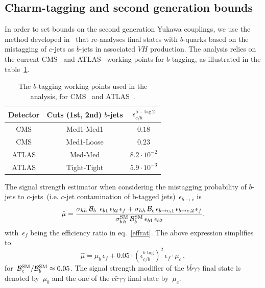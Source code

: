 \subsection{Charm-tagging and second generation bounds}
In order to set bounds on the second generation Yukawa couplings, we use the method developed in~\cite{Perez:2015aoa,Kim:2015oua} that re-analyses final states with $b$-quarks based on the mistagging of $c$-jets as $b$-jets in associated $VH$ production. The analysis relies on the current CMS~\cite{Chatrchyan:2013zna} and ATLAS~\cite{Aad:2014xzb} working points for $b$-tagging, as illustrated in the table~\ref{btag_wp}.
\begin{table}
	\centering
	\begin{tabular}{ccc}
		\toprule
		Detector	& Cuts (1st, 2nd) $b$-jets	& $\epsilon_{c/b}^{\mathrm{b-tag}\,2}$  \\
		\midrule
		CMS    & Med1-Med1   & $0.18$               \\
		CMS    & Med1-Loose  & $0.23$                \\
		\hline
		ATLAS  & Med-Med     & $8.2 \cdot 10^{-2}$ \\
		ATLAS  & Tight-Tight & $5.9 \cdot 10^{-3}$ \\
		\bottomrule
	\end{tabular}
	\caption{The $b$-tagging working points used in the analysis, for CMS~\cite{Chatrchyan:2013zna} and ATLAS~\cite{Aad:2014xzb}. }
	\label{btag_wp}
\end{table}
The signal strength estimator when considering the mistagging probability  of $b$-jets to $c$-jets~(i.e. $c$-jet contamination of b-tagged jets)~$\epsilon_{b\to c}$ is
\begin{equation}
	\hat \mu = \frac{\sigma_{hh}\, \mathcal B_b\ \,\epsilon_{b1}\,\epsilon_{b2} \,\epsilon_f+\sigma_{hh}\, \mathcal B_c \,\epsilon_{b\to c,1} \,\epsilon_{b\to c,2}\,\epsilon_f }{\sigma_{hh}^{\mathrm{SM}}\, \mathcal B_b^{\mathrm{SM}}\,  \epsilon_{b1}\,\epsilon_{b2}},
\end{equation}
with~$\epsilon_f$ being the efficiency ratio in eq.~\eqref{effrat}. The above expression simplifies to
\begin{equation}
	\hat \mu = \mu_b\,\epsilon_f +0.05\cdot \left(\epsilon_{c/b}^{\text{$b$-tag}}\right)^2 \, \epsilon_f \cdot  \mu_c\,,
\end{equation}
for~$ \mathcal B_c^{\mathrm{SM}} / \mathcal B_b^{\mathrm{SM}} \approx 0.05$. The signal strength modifier of the $b\bar{b}\gamma\gamma$ final state is denoted by~$\mu_b$ and the one of the  $c\bar{c}\gamma\gamma$ final state by~$\mu_c$.

